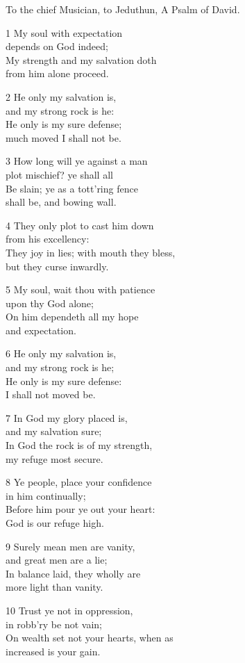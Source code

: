 \begin{multicols}{3}
To the chief Musician, to Jeduthun, A Psalm of David.

1 My soul with expectation\\
depends on God indeed;\\
My strength and my salvation doth\\
from him alone proceed.

2 He only my salvation is,\\
and my strong rock is he:\\
He only is my sure defense;\\
much moved I shall not be.

3 How long will ye against a man\\
plot mischief? ye shall all\\
Be slain; ye as a tott’ring fence\\
shall be, and bowing wall.

4 They only plot to cast him down\\
from his excellency:\\
They joy in lies; with mouth they bless,\\
but they curse inwardly.

5 My soul, wait thou with patience\\
upon thy God alone;\\
On him dependeth all my hope\\
and expectation.

6 He only my salvation is,\\
and my strong rock is he;\\
He only is my sure defense:\\
I shall not moved be.

7 In God my glory placed is,\\
and my salvation sure;\\
In God the rock is of my strength,\\
my refuge most secure.

8 Ye people, place your confidence\\
in him continually;\\
Before him pour ye out your heart:\\
God is our refuge high.

9 Surely mean men are vanity,\\
and great men are a lie;\\
In balance laid, they wholly are\\
more light than vanity.

10 Trust ye not in oppression,\\
in robb’ry be not vain;\\
On wealth set not your hearts, when as\\
increased is your gain.


\end{multicols}
